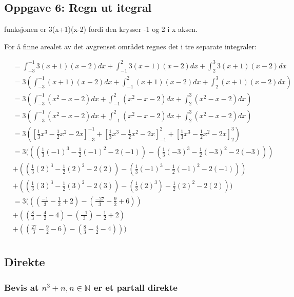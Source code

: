 \documentclass{article}
\begin{document}
\subsection{Oppgave 6: Regn ut itegral}

funksjonen er 3(x+1)(x-2) fordi den krysser -1 og 2 i x aksen.

For å finne arealet av det avgrenset området regnes det i tre separate integraler:

\begin{align*}
    &= \int_{-3}^{-1}3(x+1)(x-2)dx  + \int_{-1}^{2}3(x+1)(x-2)dx + \int_{2}^{3}3(x+1)(x-2)dx \\
    &= 3 (\int_{-3}^{-1}(x+1)(x-2)dx  + \int_{-1}^{2}(x+1)(x-2)dx + \int_{2}^{3}(x+1)(x-2)dx) \\
    &= 3 (\int_{-3}^{-1}(x^2-x-2) dx  + \int_{-1}^{2}(x^2-x-2) dx + \int_{2}^{3}(x^2-x-2) dx) \\
    &= 3 (\int_{-3}^{-1}(x^2-x-2) dx  + \int_{-1}^{2}(x^2-x-2) dx + \int_{2}^{3}(x^2-x-2) dx) \\
    &= 3 ([\frac{1}{3}x^3 - \frac{1}{2} x^2 - 2x]^{-1}_{-3} + [\frac{1}{3}x^3 - \frac{1}{2} x^2 - 2x]^2_{-1} + [\frac{1}{3}x^3 - \frac{1}{2} x^2 - 2x]^3_2) \\
    &= 3 (((\frac{1}{3}(-1)^3 - \frac{1}{2} (-1)^2 - 2(-1)) - (\frac{1}{3}(-3)^3 - \frac{1}{2} (-3)^2 - 2(-3))) \\
    &+ ((\frac{1}{3}(2)^3 - \frac{1}{2} (2)^2 - 2(2)) - (\frac{1}{3}(-1)^3 - \frac{1}{2} (-1)^2 - 2(-1))) \\
    &+ ((\frac{1}{3}(3)^3 - \frac{1}{2} (3)^2 - 2(3)) - (\frac{1}{3}(2)^3) - \frac{1}{2} (2)^2 - 2(2))) \\
    &= 3 (((\frac{-1}{3}-\frac{1}{2}+2) - (\frac{-27}{3}-\frac{9}{2}+6)) \\
    &+ ((\frac{8}{3}-\frac{4}{2}-4) - (\frac{-1}{3})-\frac{1}{2}+2) \\
    &+ ((\frac{27}{3} - \frac{9}{2} - 6) - (\frac{8}{3}-\frac{4}{2}-4))) \\
\end{align*}


\subsection{Direkte}

\subsubsection{Bevis at $n^3+n, n \in \mathbb{N}$ er et partall direkte}
\end{document}
